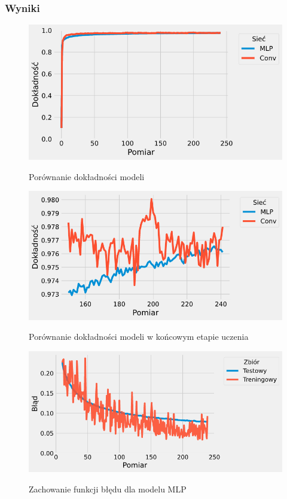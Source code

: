 \documentclass{article}
\begin{document}
\subsubsection*{Wyniki}
\begin{figure}[H]
	\centering
	\caption{Porównanie dokładności modeli}
	\includegraphics[width=\textwidth]{con_mlp_acc.png}
	\label{fig:res21}
\end{figure}
\begin{figure}[H]
	\centering
	\caption{Porównanie dokładności modeli w końcowym etapie uczenia}
	\includegraphics[width=\textwidth]{con_mlp_acc_zoom.png}
	\label{fig:res22}
\end{figure}
\begin{figure}[H]
	\centering
	\caption{Zachowanie funkcji błędu dla modelu MLP}
	\includegraphics[width=\textwidth]{mlp_err.png}
	\label{fig:res23}
\end{figure}
\end{document}
